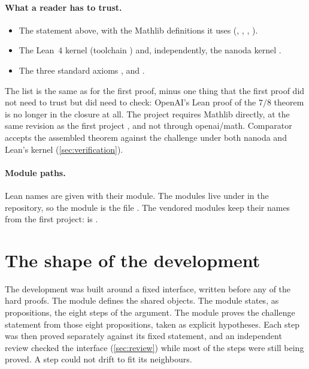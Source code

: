 \documentclass[11pt]{article}
\theoremstyle{definition}
\begin{document}
\paragraph{What a reader has to trust.}
\begin{itemize}[nosep]
\item The statement above, with the Mathlib definitions it uses (, , , ).
\item The Lean~4 kernel (toolchain ) and, independently, the nanoda kernel \cite{nanoda}.
\item The three standard axioms ,  and .
\end{itemize}
The list is the same as for the first proof, minus one thing that the first proof did not need to trust but did need to check: OpenAI's Lean proof of the $7/8$ theorem is no longer in the closure at all. The project requires Mathlib directly, at the same revision  as the first project \cite{Mathlib2020,Lean4}, and not through openai/math. Comparator accepts the assembled theorem against the challenge under both nanoda and Lean's kernel (\cref{sec:verification}).

\paragraph{Module paths.} Lean names are given with their module. The modules live under  in the repository, so the module  is the file . The vendored modules keep their names from the first project:  is .

\section{The shape of the development}\label{sec:shape}

The development was built around a fixed interface, written before any of the hard proofs. The module  defines the shared objects. The module  states, as propositions, the eight steps of the argument. The module  proves the challenge statement from those eight propositions, taken as explicit hypotheses. Each step was then proved separately against its fixed statement, and an independent review checked the interface (\cref{sec:review}) while most of the steps were still being proved. A step could not drift to fit its neighbours.
\end{document}
